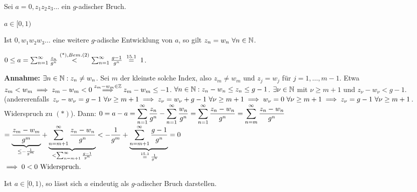\documentclass[a4paper,twoside,DIV15,BCOR12mm]{scrbook}
\begin{document}
\begin{satz}
Sei $a=0,z_1z_2z_3\ldots$ ein $g$-adischer Bruch.
\begin{liste}
\item $a\in[0,1)$
\item Ist $0,w_1w_2w_3\ldots$ eine weitere $g$-adische Entwicklung von $a$, so gilt $z_n = w_n \ \forall n\in\mathbb{N}$.
\end{liste}
\end{satz}

\begin{beweise}
\item $0 \le a = \reihe{\frac{z_n}{g^n}} \stackrel{\text{(*)}, Bem. (2)}{<} \reihe{\frac{g-1}{g^n}} \gleichnach{15.1} 1$.
\item \textbf{Annahme:} $\exists n\in\mathbb{N}: z_n \ne w_n$. Sei $m$ der kleinste solche Index, also $z_m \ne w_m$ und $z_j = w_j$ für $j=1,\ldots ,m-1$. Etwa $z_m < w_m \implies z_m - w_m < 0 \overset{z_m - w_m \in\mathbb{Z}}{\implies} z_m - w_m \le -1$. $\forall n\in\mathbb{N}: z_n - w_n \le z_n \le g-1$. $\exists \nu \in\mathbb{N}$ mit $\nu \ge m+1$ und $z_\nu - w_\nu < g-1$. (andererenfalls $z_\nu - w_\nu = g-1 \ \forall \nu \ge m+1 \implies z_\nu = w_\nu + g-1 \ \forall \nu \ge m+1 \implies w_\nu = 0 \ \forall \nu \ge m+1 \implies z_\nu = g-1 \ \forall \nu \ge m+1$. Widerspruch zu $(*)$). Dann: 
$\displaystyle{0 = a-a = \sum_{n=1}^{\infty}{\frac{z_n}{g^n}} - \sum_{n=1}^{\infty}{\frac{w_n}{g^n}} = \sum_{n=1}^{\infty}{\frac{z_n - w_n}{g^n}} = \sum_{n=m}^\infty{\frac{z_n - w_n}{g^n}}}$\\
$\displaystyle{= \underbrace{\frac{z_m - w_m}{g^m}}_{\le -\frac{1}{g^m}} + \underbrace{\sum_{n=m+1}^\infty{\frac{z_n-w_n}{g^n}}}_{< \sum_{n=m+1}^\infty{\frac{g-1}{g^n}}} < - \frac{1}{g^m} + \underbrace{\sum_{n=m+1}^\infty{\frac{g-1}{g^n}}}_{\gleichnach{15.1} \frac{1}{g^n}} = 0}$\\
$\implies 0<0 \text{  Widerspruch.}$
\end{beweise}

\begin{satz}
Ist $a\in[0,1)$, so lässt sich $a$ eindeutig als $g$-adischer Bruch darstellen.
\end{satz}
\end{document}
